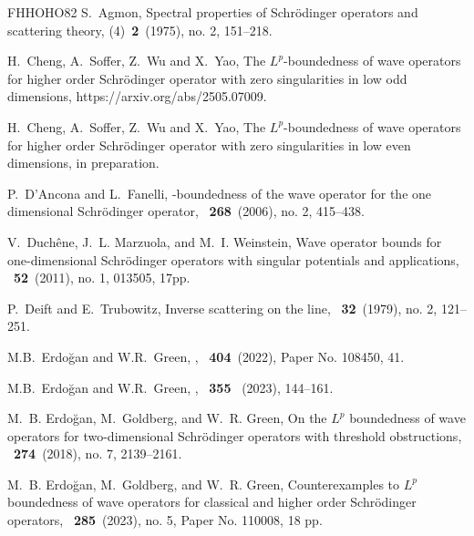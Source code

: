 \documentclass[reqno]{amsart}
\numberwithin{equation}{section}
\begin{document}
\normalem
\begin{thebibliography}{FHHOHO82}
S.~Agmon,
\newblock Spectral properties of {S}chr\"{o}dinger operators and scattering
  theory,
 (4)~{\bf2}~(1975), no. 2, 151--218.

H.~Cheng, A.~Soffer, Z.~Wu and X.~Yao,
\newblock The $L^p$-boundedness of wave operators for higher order Schr\"odinger operator with zero singularities in low odd dimensions,
\newblock https://arxiv.org/abs/2505.07009.

H.~Cheng, A.~Soffer, Z.~Wu and X.~Yao,
\newblock The $L^p$-boundedness of wave operators for higher order Schr\"odinger operator with zero singularities in low even dimensions,
\newblock
in preparation.

P.~D'Ancona and L.~Fanelli,
-boundedness of the wave operator for the one dimensional
  {S}chr\"{o}dinger operator,
~{\bf268}~(2006), no. 2, 415--438.

V.~Duch\^{e}ne, J.~L. Marzuola, and M.~I. Weinstein,
\newblock Wave operator bounds for one-dimensional {S}chr\"{o}dinger operators
with singular potentials and applications,
~{\bf52}~(2011), no. 1, 013505, 17pp.

P.~Deift and E.~Trubowitz,
\newblock Inverse scattering on the line,
~{\bf32}~(1979), no. 2, 121--251.

{M.B.~Erdo\u{g}an and W.R.~Green},
,
~{\bf404}~(2022), Paper No. 108450, 41.

{M.B.~Erdo\u{g}an and W.R.~Green},
,
~{\bf 355 }~(2023), 144--161.


M.~B. Erdo\u{g}an, M.~Goldberg, and W.~R. Green,
\newblock On the {$L^p$} boundedness of wave operators for two-dimensional
  {S}chr\"{o}dinger operators with threshold obstructions,
~{\bf274}~(2018), no. 7, 2139--2161.

M.~B. Erdo\u{g}an, M.~Goldberg, and W.~R. Green,
\newblock Counterexamples to {$L^p$} boundedness of wave operators for
  classical and higher order {S}chr\"{o}dinger operators,
~{\bf285}~(2023), no. 5, Paper No. 110008, 18 pp.


\end{thebibliography}
\end{document}
